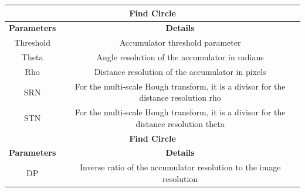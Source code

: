 \documentclass{article}
\begin{document}
\begin{table}[H]
\begin{center}
\begin{tabular}{|c|c|l|l|l|}
\hline
\multicolumn{5}{|c|}{\textbf{Find Circle}}                                                                                                                                                      \\ \hline
\textbf{Parameters}    & \multicolumn{4}{|c|}{\textbf{Details}}                                                                                                                                 \\ \hline
Threshold              & \multicolumn{4}{|c|}{Accumulator threshold parameter}                                                                                                                  \\ \hline
Theta                  & \multicolumn{4}{|c|}{Angle resolution of the accumulator in radians}                                                                                                   \\ \hline
Rho                    & \multicolumn{4}{|c|}{Distance resolution of the accumulator in pixels}                                                                                                 \\ \hline
SRN                    & \multicolumn{4}{|c|}{For the multi-scale Hough transform, it is a divisor for the distance resolution rho}                                                             \\ \hline
STN                    & \multicolumn{4}{|c|}{For the multi-scale Hough transform, it is a divisor for the distance resolution theta}                                                           \\ \hline
\multicolumn{5}{|c|}{\textbf{Find Circle}}                                                                                                                                                      \\ \hline
\textbf{Parameters}    & \multicolumn{4}{|c|}{\textbf{Details}}                                                                                                                                 \\ \hline
DP                     & \multicolumn{4}{|c|}{Inverse ratio of the accumulator resolution to the image resolution}                                                                              \\ \hline

\end{tabular}
\end{center}
\end{table}
\end{document}
